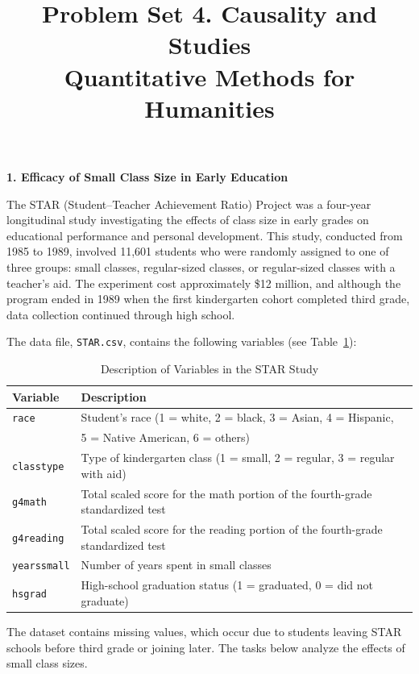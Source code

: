 \documentclass[12pt]{article}
\author{\empty}
\title{Problem Set 4. Causality and Studies \\ Quantitative Methods for Humanities}
\date{\empty}
\begin{document}
\maketitle

\begin{center}
    \textbf{\large 1. Efficacy of Small Class Size in Early Education}    
\end{center}

The STAR (Student–Teacher Achievement Ratio) Project was a four-year longitudinal study investigating the effects of class size in early grades on educational performance and personal development. This study, conducted from 1985 to 1989, involved 11,601 students who were randomly assigned to one of three groups: small classes, regular-sized classes, or regular-sized classes with a teacher's aid. The experiment cost approximately \$12 million, and although the program ended in 1989 when the first kindergarten cohort completed third grade, data collection continued through high school.

The data file, \texttt{STAR.csv}, contains the following variables (see Table~\ref{tab:star-data}):

\begin{table}[h]
\centering
\caption{Description of Variables in the STAR Study}\label{tab:star-data}
\begin{tabular}{ll}
\toprule
\textbf{Variable} & \textbf{Description} \\
\midrule
\texttt{race} & Student’s race (1 = white, 2 = black, 3 = Asian, 4 = Hispanic, \\
              & 5 = Native American, 6 = others) \\
\texttt{classtype} & Type of kindergarten class (1 = small, 2 = regular, 3 = regular with aid) \\
\texttt{g4math} & Total scaled score for the math portion of the fourth-grade standardized test \\
\texttt{g4reading} & Total scaled score for the reading portion of the fourth-grade standardized test \\
\texttt{yearssmall} & Number of years spent in small classes \\
\texttt{hsgrad} & High-school graduation status (1 = graduated, 0 = did not graduate) \\
\bottomrule
\end{tabular}
\end{table}

The dataset contains missing values, which occur due to students leaving STAR schools before third grade or joining later. The tasks below analyze the effects of small class sizes.
\end{document}
